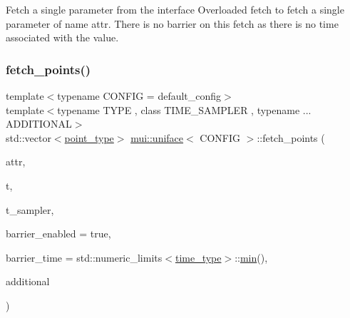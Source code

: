 Fetch a single parameter from the interface Overloaded {\ttfamily fetch} to fetch a single parameter of name {\ttfamily attr}. There is no barrier on this fetch as there is no time associated with the value. 

\mbox{\label{classmui_1_1uniface_aa5fba70a831eece35bfc85e92fc080d1}} 
\subsubsection{\texorpdfstring{fetch\+\_\+points()}{fetch\_points()}}
{\footnotesize\ttfamily template$<$typename C\+O\+N\+F\+IG  = default\+\_\+config$>$ \\
template$<$typename T\+Y\+PE , class T\+I\+M\+E\+\_\+\+S\+A\+M\+P\+L\+ER , typename ... A\+D\+D\+I\+T\+I\+O\+N\+AL$>$ \\
std\+::vector$<$\hyperlink{classmui_1_1uniface_abc356ab801269c69e38dc07179f85ef9}{point\+\_\+type}$>$ \hyperlink{classmui_1_1uniface}{mui\+::uniface}$<$ C\+O\+N\+F\+IG $>$\+::fetch\+\_\+points (\begin{DoxyParamCaption}\item[{const std\+::string \&}]{attr,  }\item[{const \hyperlink{classmui_1_1uniface_a65cbecf1936d7d61cb45f14b1138dc07}{time\+\_\+type}}]{t,  }\item[{const T\+I\+M\+E\+\_\+\+S\+A\+M\+P\+L\+ER \&}]{t\+\_\+sampler,  }\item[{bool}]{barrier\+\_\+enabled = {\ttfamily true},  }\item[{\hyperlink{classmui_1_1uniface_a65cbecf1936d7d61cb45f14b1138dc07}{time\+\_\+type}}]{barrier\+\_\+time = {\ttfamily std\+:\+:numeric\+\_\+limits$<$\hyperlink{classmui_1_1uniface_a65cbecf1936d7d61cb45f14b1138dc07}{time\+\_\+type}$>$\+:\+:\hyperlink{namespacemui_afabb57f76b23f5a3542a0510943e69e0}{min}()},  }\item[{A\+D\+D\+I\+T\+I\+O\+N\+AL \&\&...}]{additional }\end{DoxyParamCaption})\hspace{0.3cm}{\ttfamily [inline]}}

\mbox{\label{classmui_1_1uniface_a23f0fc2d6720842eb274afd47021c09a}} 
